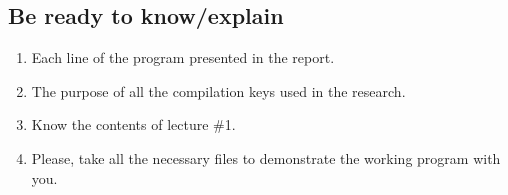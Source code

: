 { %
	\subsection{Be ready to know/explain}
	\begin{enumerate}
		\item Each line of the program presented in the report.
		\item The purpose of all the compilation keys used in the research.
		\item Know the contents of lecture \#1.
		\item Please, take all the necessary files to demonstrate the working program with you.
	\end{enumerate}
}